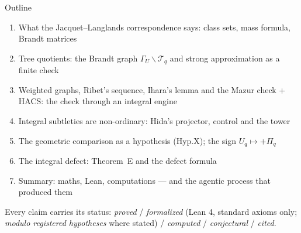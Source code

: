 
\begin{frame}{Outline}
  \small
  \begin{enumerate}
    \item[S01] What the Jacquet--Langlands correspondence says: class sets, mass formula, Brandt matrices
    \item[S02] Tree quotients: the Brandt graph $\Gamma_U\backslash\mathcal T_q$ and strong approximation as a finite check
    \item[S03] Weighted graphs, Ribet's sequence, Ihara's lemma and the Mazur check
      \hfill{\scriptsize + HACS: the check through an integral engine}
    \item[S04] Integral subtleties are non-ordinary: Hida's projector, control and the tower
    \item[S05] The geometric comparison as a hypothesis (Hyp.X); the sign $U_q\mapsto+\Pi_q$
    \item[S06] The integral defect: Theorem~E and the defect formula
    \item[] Summary: maths, Lean, computations --- and the agentic process that produced them
  \end{enumerate}
  \vfill
  {\scriptsize Every claim carries its status: \emph{proved} / \emph{formalized} (Lean 4, standard axioms only; \emph{modulo registered hypotheses} where stated) / \emph{computed} / \emph{conjectural} / \emph{cited}.}
\end{frame}
